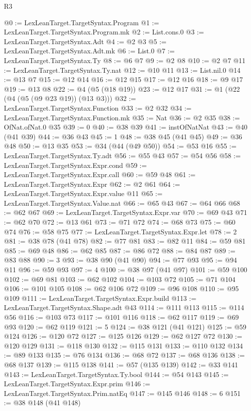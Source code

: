 \begin{lexlean}{R3}
\begin{coremodule}
@0 := LexLeanTarget.TargetSyntax.Program
@1 := LexLeanTarget.TargetSyntax.Program.mk
@2 := List.cons.{0}
@3 := LexLeanTarget.TargetSyntax.Adt
@4 := @2 @3
@5 := LexLeanTarget.TargetSyntax.Adt.mk
@6 := List.{0}
@7 := LexLeanTarget.TargetSyntax.Ty
@8 := @6 @7
@9 := @2 @8
@10 := @2 @7
@11 := LexLeanTarget.TargetSyntax.Ty.nat
@12 := @10 @11
@13 := List.nil.{0}
@14 := @13 @7
@15 := @12 @14
@16 := @12 @15
@17 := @12 @16
@18 := @9 @17
@19 := @13 @8
@22 := @4 (@5 (@18 @19))
@23 := @12 @17
@31 := @1 (@22 (@4 (@5 (@9 @23 @19)) (@13 @3)))
@32 := LexLeanTarget.TargetSyntax.Function
@33 := @2 @32
@34 := LexLeanTarget.TargetSyntax.Function.mk
@35 := Nat
@36 := @2 @35
@38 := OfNat.ofNat.{0} @35
@39 := 0
@40 := @38 @39
@41 := instOfNatNat
@43 := @40 (@41 @39)
@44 := @36 @43
@45 := 1
@48 := @38 @45 (@41 @45)
@49 := @36 @48
@50 := @13 @35
@53 := @34 (@44 (@49 @50))
@54 := @53 @16
@55 := LexLeanTarget.TargetSyntax.Ty.adt
@56 := @55 @43
@57 := @54 @56
@58 := LexLeanTarget.TargetSyntax.Expr.cond
@59 := LexLeanTarget.TargetSyntax.Expr.call
@60 := @59 @48
@61 := LexLeanTarget.TargetSyntax.Expr
@62 := @2 @61
@64 := LexLeanTarget.TargetSyntax.Expr.value @11
@65 := LexLeanTarget.TargetSyntax.Value.nat
@66 := @65 @43
@67 := @64 @66
@68 := @62 @67
@69 := LexLeanTarget.TargetSyntax.Expr.var
@70 := @69 @43
@71 := @62 @70
@72 := @13 @61
@73 := @71 @72
@74 := @68 @73
@75 := @60 @74
@76 := @58 @75
@77 := LexLeanTarget.TargetSyntax.Expr.let
@78 := 2
@81 := @38 @78 (@41 @78)
@82 := @77 @81
@83 := @82 @11
@84 := @59 @81
@85 := @69 @48
@86 := @62 @85
@87 := @86 @72
@88 := @84 @87
@89 := @83 @88
@90 := 3
@93 := @38 @90 (@41 @90)
@94 := @77 @93
@95 := @94 @11
@96 := @59 @93
@97 := 4
@100 := @38 @97 (@41 @97)
@101 := @59 @100
@102 := @69 @81
@103 := @62 @102
@104 := @103 @72
@105 := @71 @104
@106 := @101 @105
@108 := @62 @106 @72
@109 := @96 @108
@110 := @95 @109
@111 := LexLeanTarget.TargetSyntax.Expr.build
@113 := LexLeanTarget.TargetSyntax.Shape.adt @43
@114 := @111 @113
@115 := @114 @56
@116 := @103 @73
@117 := @101 @116
@118 := @62 @117
@119 := @69 @93
@120 := @62 @119
@121 := 5
@124 := @38 @121 (@41 @121)
@125 := @59 @124
@126 := @120 @72
@127 := @125 @126
@129 := @62 @127 @72
@130 := @120 @129
@131 := @118 @130
@132 := @115 @131
@133 := @110 @132
@134 := @89 @133
@135 := @76 @134
@136 := @68 @72
@137 := @68 @136
@138 := @68 @137
@139 := @115 @138
@141 := @57 (@135 @139)
@142 := @33 @141
@143 := LexLeanTarget.TargetSyntax.Ty.bool
@144 := @54 @143
@145 := LexLeanTarget.TargetSyntax.Expr.prim
@146 := LexLeanTarget.TargetSyntax.Prim.natEq
@147 := @145 @146
@148 := 6
@151 := @38 @148 (@41 @148)

\end{coremodule}
\end{lexlean}
